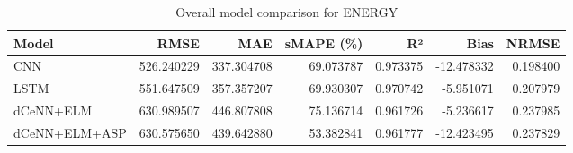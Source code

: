 \begin{table}
\caption{Overall model comparison for ENERGY}
\begin{tabular}{lrrrrrr}
\toprule
Model & RMSE & MAE & sMAPE (\%) & R² & Bias & NRMSE \\
\midrule
CNN & 526.240229 & 337.304708 & 69.073787 & 0.973375 & -12.478332 & 0.198400 \\
LSTM & 551.647509 & 357.357207 & 69.930307 & 0.970742 & -5.951071 & 0.207979 \\
dCeNN+ELM & 630.989507 & 446.807808 & 75.136714 & 0.961726 & -5.236617 & 0.237985 \\
dCeNN+ELM+ASP & 630.575650 & 439.642880 & 53.382841 & 0.961777 & -12.423495 & 0.237829 \\
\bottomrule
\end{tabular}
\end{table}
